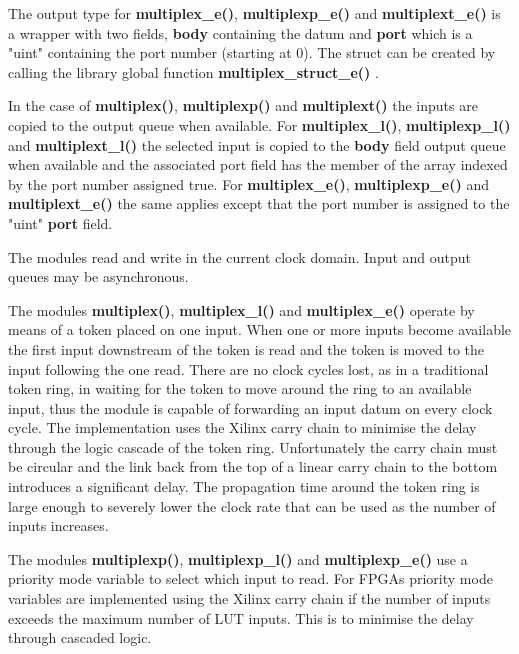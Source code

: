             The output type for {\bf multiplex\_e()}, {\bf multiplexp\_e()} and
            {\bf multiplext\_e()} is a wrapper with two fields, {\bf body}
            containing the datum and {\bf port}  which is a "uint" containing
            the port number (starting at 0). The struct can be created by
            calling the library global function {\bf multiplex\_struct\_e()}
            .
            
            In the case of {\bf multiplex()}, {\bf multiplexp()} and {\bf
            multiplext()} the inputs are copied to the output queue when
            available. For {\bf multiplex\_l()}, {\bf multiplexp\_l()} and {\bf
            multiplext\_l()} the selected input is copied to the {\bf body}
            field output queue when available and the associated port field has
            the member of the array indexed by the port number assigned true.
            For {\bf multiplex\_e()}, {\bf multiplexp\_e()} and {\bf
            multiplext\_e()} the same applies except that the port number is
            assigned to the "uint" {\bf port} field.
            
            The modules read and write in the current clock domain. Input
            and output queues may be asynchronous.
            
            The modules {\bf multiplex()}, {\bf multiplex\_l()} and {\bf
            multiplex\_e()} operate by means of a token placed on one input.
            When one or more inputs become available the first input downstream
            of the token is read and the token is moved to the input following
            the one read. There are no clock cycles lost, as in a traditional
            token ring, in waiting for the token to move around the ring to an
            available input, thus the module is capable of forwarding an input
            datum on every clock cycle. The implementation uses the Xilinx carry
            chain to minimise the delay through the logic cascade of the token
            ring. Unfortunately the carry chain must be circular and the link
            back from the top of a linear carry chain to the bottom introduces
            a significant delay. The propagation time around the token ring
            is large enough to severely lower the clock rate that can be used
            as the number of inputs increases.
            
            The modules {\bf multiplexp()}, {\bf multiplexp\_l()} and {\bf
            multiplexp\_e()} use a priority mode variable to select which input
            to read. For FPGAs priority mode variables are implemented using the
            Xilinx carry chain if the number of inputs exceeds the maximum
            number of LUT inputs. This is to minimise the delay through cascaded
            logic.
            

